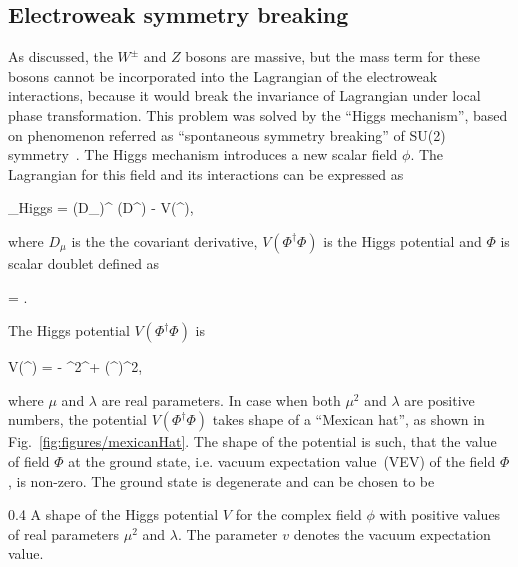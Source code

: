 


\subsection{Electroweak symmetry breaking~\label{sec:EWbreaking}}

As discussed, the $W^{\pm}$ and $Z$ bosons are massive, but the mass term for these bosons cannot be incorporated into the Lagrangian of the electroweak interactions, because it would break the invariance of Lagrangian under local phase transformation. This problem was solved by the ``Higgs mechanism'', based on phenomenon referred as ``spontaneous symmetry breaking'' of SU(2) symmetry~\cite{Englert:1964et, Higgs:1964ia, Guralnik:1964eu}. The Higgs mechanism introduces a new scalar field $\phi$. The Lagrangian for this field and its interactions can be expressed as 

{
    _{Higgs} =  (D_{\mu}\Phi)^{\dagger} (D^{\mu}\Phi) - V(\Phi^{\dagger}\Phi),
}

where $D_{\mu}$ is the the covariant derivative, $V(\Phi^{\dagger}\Phi)$ is the Higgs potential and $\Phi$ is scalar doublet defined as


{
    \Phi = .
}

The Higgs potential $V(\Phi^{\dagger}\Phi)$ is

{
    V(\Phi^{\dagger}\Phi) =  -  \mu^{2}\Phi^{\dagger}\Phi +  \lambda(\Phi^{\dagger}\Phi)^{2},
}



where $\mu$ and $\lambda$ are real parameters. In case when both $\mu^{2}$ and $\lambda$ are positive numbers, the potential $V(\Phi^{\dagger}\Phi)$ takes shape of a ``Mexican hat'', as shown in Fig.~\ref{fig:figures/mexicanHat}. The shape of the potential is such, that the value of field $\Phi$ at the ground state, i.e. vacuum expectation value~(VEV) of the field $\Phi$, is non-zero. The ground state is degenerate and can be chosen to be

                 {0.4}       %
                 { A shape of the Higgs potential $V$ for the complex field $\phi$ with positive values of real parameters $\mu^{2}$ and $\lambda$. The parameter $v$ denotes the vacuum expectation value.}


